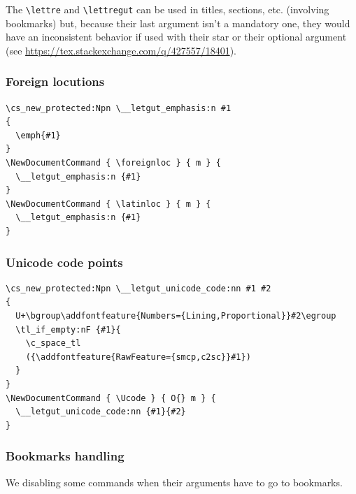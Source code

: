 \documentclass{letgut}
\begin{document}
The \lstinline+\lettre+ and \lstinline+\lettregut+ can be used in titles, sections, etc. (involving
bookmarks) but, because their last argument isn't a mandatory one, they would
have an inconsistent behavior if used with their star or their optional
argument (see \url{https://tex.stackexchange.com/q/427557/18401}).
\subsubsection{Foreign locutions}
\label{ImplementationDocumentcommandsForeignlocutions-1svg55h0jlj0}
\begin{lstlisting}
\cs_new_protected:Npn \__letgut_emphasis:n #1
{
  \emph{#1}
}
\NewDocumentCommand { \foreignloc } { m } {
  \__letgut_emphasis:n {#1}
}
\NewDocumentCommand { \latinloc } { m } {
  \__letgut_emphasis:n {#1}
}
\end{lstlisting}
\subsubsection{Unicode code points}
\label{ImplementationDocumentcommandsUnicodecodes-30lksfa0nlj0}
\begin{lstlisting}
\cs_new_protected:Npn \__letgut_unicode_code:nn #1 #2
{
  U+\bgroup\addfontfeature{Numbers={Lining,Proportional}}#2\egroup
  \tl_if_empty:nF {#1}{
    \c_space_tl
    ({\addfontfeature{RawFeature={smcp,c2sc}}#1})
  }
}
\NewDocumentCommand { \Ucode } { O{} m } {
  \__letgut_unicode_code:nn {#1}{#2}
}
\end{lstlisting}
\subsubsection{Bookmarks handling}
\label{ImplementationDocumentcommandsBookmarkshandling-zbxg55h0jlj0}
We disabling some commands when their arguments have to go to bookmarks.
\end{document}

